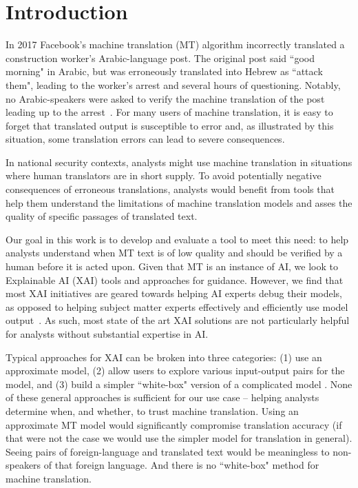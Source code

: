 \section{Introduction}

In 2017 Facebook's machine translation (MT) algorithm incorrectly translated a construction worker's Arabic-language post. The original post said ``good morning" in Arabic, but was erroneously translated into Hebrew as ``attack them", leading to the worker's arrest and several hours of questioning. Notably, no Arabic-speakers were asked to verify the machine translation of the post leading up to the arrest~\cite{hernFacebook2017}. For many users of machine translation, it is easy to forget that translated output is susceptible to error and, as illustrated by this situation, some translation errors can lead to severe consequences. 

In national security contexts, analysts might use machine translation in situations where human translators are in short supply. To avoid potentially negative consequences of erroneous translations, analysts would benefit from tools that help them understand the limitations of machine translation models and asses the quality of specific passages of translated text.  

Our goal in this work is to develop and evaluate a tool to meet this need: to help analysts understand when MT text is of low quality and should be verified by a human before it is acted upon. Given that MT is an instance of AI, we look to Explainable AI (XAI) tools and approaches for guidance. However, we find that most XAI initiatives are geared towards helping AI experts debug their models, as opposed to helping subject matter experts effectively and efficiently use model output~\cite{brennen2020What}. As such, most state of the art XAI solutions are not particularly helpful for analysts without substantial expertise in AI.  

Typical approaches for XAI can be broken into three categories: (1) use an approximate model, (2) allow users to explore various input-output pairs for the model, and (3) build a simpler ``white-box" version of a complicated model \cite{RiberoLIME2016, SelbstBarocasIntuitive2018, MittelstadtRussellExplain2019}. None of these general approaches is sufficient for our use case -- helping analysts determine when, and whether, to trust machine translation. Using an approximate MT model would significantly compromise translation accuracy (if that were not the case we would use the simpler model for translation in general). Seeing pairs of foreign-language and translated text would be meaningless to non-speakers of that foreign language. And there is no ``white-box" method for machine translation.      

